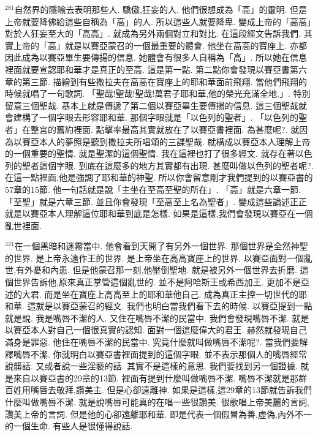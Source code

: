 \documentclass{book}
\begin{document}
$^{281}$自然界的隱喻去表明那些人.
驕傲,狂妄的人.
他們很想成為「高」的靈明.
但是上帝就要降佛給這些自稱為「高」的人.
所以這些人就要降卑.
變成上帝的「高高」對於人狂妄至大的「高高」.
就成為另外兩個對立和對比.
在這段經文告訴我們.
其實上帝的「高」就是以賽亞蒙召的一個最重要的體會.
他坐在高高的寶座上.
亦都因此成為以賽亞畢生要傳揚的信息.
她體會有很多人自稱為「高」.
所以她在信息裡面就要宣認耶和華才是真正的至高.
這是第一點.
第二點你會發現以賽亞書第六章的第三節.
描繪到有些撒拉夫在高高在寶座上的耶和華面前飛翔.
當他們飛翔的時候就唱了一句歌詞.
「聖哉!聖哉!聖哉!萬君子耶和華,他的榮光充滿全地.」.
特別留意三個聖哉.
基本上就是傳遞了第二個以賽亞畢生要傳揚的信息.
這三個聖哉就會建構了一個字眼去形容耶和華.
那個字眼就是「以色列的聖者」.
「以色列的聖者」在整宮的舊約裡面.
點擊率最高其實就放在了以賽亞書裡面.
為甚麼呢?.
就因為以賽亞本人的夢照是聽到撒拉夫所唱頌的三諜聖哉.
就構成以賽亞本人理解上帝的一個重要的聖情.
就是聖潔的這個聖情.
我在這裡也打了很多經文.
就存在著以色列的聖者這個字眼.
到底在這麼多的地方其實都有出現.
甚麼叫做以色列的聖者呢?.
在這一點裡面,他是強調了耶和華的神聖.
所以你會留意剛才我們提到的以賽亞書的57章的15節.
他一句話就是說「主坐在至高至聖的所在」.
「高」就是六章一節.
「至聖」就是六章三節.
並且你會發現「至高至上名為聖者」.
變成這些論述正正就是以賽亞本人理解這位耶和華到底是怎樣.
如果是這樣,我們會發現以賽亞在一個亂世裡面.

$^{321}$在一個黑暗和迷霧當中.
他會看到天開了有另外一個世界.
那個世界是全然神聖的世界.
是上帝永遠作王的世界.
是上帝坐在高高寶座上的世界.
以賽亞面對一個亂世,有外憂和內患.
但是他蒙召那一刻,他壓倒聖地.
就是被另外一個世界去折磨.
這個世界告訴他,原來真正掌管這個亂世的.
並不是阿哈斯王或希西加王.
更加不是亞述的大君.
而是坐在寶座上高高至上的耶和華他自己.
成為真正主控一切世代的耶和華.
這就是以賽亞蒙召的經文.
我們也明白當我們看下去的時候.
以賽亞提到一點就是說.
我是嘴唇不潔的人.
又住在嘴唇不潔的民當中.
我們會發現嘴唇不潔.
就是以賽亞本人對自己一個很真實的認知.
面對一個這麼偉大的君王.
赫然就發現自己滿身是罪惡.
他住在嘴唇不潔的民當中.
究竟什麼就叫做嘴唇不潔呢?.
當我們要解釋嘴唇不潔.
你就明白以賽亞書裡面提到的這個字眼.
並不表示那個人的嘴唇經常說髒話.
又或者說一些淫褻的話.
其實不是這樣的意思.
我們要找到另一個證據.
就是來自以賽亞書的29章的13節.
裡面有提到什麼叫做嘴唇不潔.
嘴唇不潔就是那群百姓用嘴唇去敬拜,讚美主.
但是心卻遠離神.
如果是這樣,這29章的13節就告訴我們什麼叫做嘴唇不潔.
就是說嘴唇可能真的在唱一些很讚美.
很歌唱上帝美麗的言詞,讚美上帝的言詞.
但是他的心卻遠離耶和華.
即是代表一個假冒為善,虛偽,內外不一的一個生命.
有些人是很懂得說話.
\end{document}
